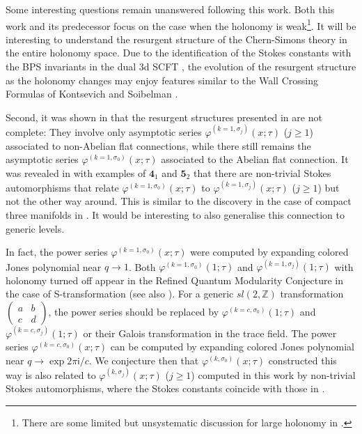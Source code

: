 \documentclass[a4paper,11pt]{article}	%
\def\md{\mathbf}
\def\IZ{\mathbb{Z}}
\newcommand{\ri}{{\mathsf{i}}}
\newcommand{\s}{\sigma}
\newcommand{\knot}[1]{\md{#1}}
\begin{document}
Some interesting questions remain unanswered following this work.
Both this work and its predecessor \cite{Garoufalidis:2020xec} focus
on the case when the holonomy is weak\footnote{There are some limited
  but unsystematic discussion for large holonomy in
  \cite{Garoufalidis:2020xec}.}.  It will be interesting to understand
the resurgent structure of the Chern-Simons theory in the entire
holonomy space.  Due to the identification of the Stokes constants
with the BPS invariants in the dual 3d SCFT
\cite{Garoufalidis:2020xec,Garoufalidis:2020nut}, the evolution of the
resurgent structure as the holonomy changes may enjoy features similar
to the Wall Crossing Formulas of Kontsevich and Soibelman
\cite{Kontsevich:2008fj}.

Second, it was shown in \cite{Garoufalidis:2021osl} that the resurgent
structures presented in
\cite{Garoufalidis:2020xec,Garoufalidis:2020nut} are not complete:
They involve only asymptotic series $\varphi^{(k=1,\s_j)}(x;\tau)$
($j\geq 1$) associated to non-Abelian flat connections, while there
still remains the asymptotic series $\varphi^{(k=1,\s_0)}(x;\tau)$
associated to the Abelian flat connection.  It was revealed in
\cite{Garoufalidis:2021osl} with examples of $\knot{4}_1$ and
$\knot{5}_2$ that there are non-trivial Stokes automorphisms that
relate $\varphi^{(k=1,\s_0)}(x;\tau)$ to
$\varphi^{(k=1,\s_j)}(x;\tau)$ ($j\geq 1$) but not the other way
around.  This is similar to the discovery in the case of compact three
manifolds in \cite{Gukov2016}.  It would be interesting to also
generalise this connection to generic levels.

In fact, the power series $\varphi^{(k=1,\s_0)}(x;\tau)$ were computed
by expanding colored Jones polynomial near $q\rightarrow 1$.  Both
$\varphi^{(k=1,\s_0)}(1;\tau)$ and $\varphi^{(k=1,\s_j)}(1;\tau)$ with
holonomy turned off appear in the Refined Quantum Modularity
Conjecture \cite{Zagier:2010qmf,Garoufalidis:2021lcp} in the case of
S-transformation (see also \cite{Dimofte:2015kkp,Dimofte:2012qj}).
For a generic $sl(2,\IZ)$ transformation
$(\begin{smallmatrix} a&b\\c&d\end{smallmatrix})$, the power series
should be replaced by $\varphi^{(k=c,\s_0)}(1;\tau)$ and
$\varphi^{(k=c,\s_j)}(1;\tau)$ or their Galois transformation in the
trace field.  The power series $\varphi^{(k=c,\s_0)}(x;\tau)$ can be
computed by expanding colored Jones polynomial near
$q\rightarrow \exp2\pi\ri/c$.  We conjecture then that
$\varphi^{(k,\s_0)}(x;\tau)$ constructed this way is also related to
$\varphi^{(k,\s_j)}(x;\tau)$ ($j\geq 1$) computed in this work by
non-trivial Stokes automorphisms, where the Stokes constants coincide
with those in \cite{Garoufalidis:2021osl}.
\end{document}
